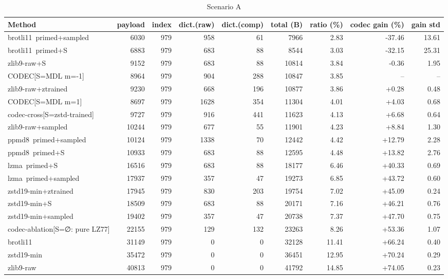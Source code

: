 \begin{table}[h]\centering\footnotesize\caption{Scenario A}\begin{tabular}{lrrrrrrrr}\toprule
Method & payload & index & dict.(raw) & dict.(comp) & total (B) & ratio (\%) & codec gain (\%) & gain std \\\midrule
brotli11~primed+sampled & 6030 & 979 & 958 & 61 & 7966 & 2.83 & -37.46 & 13.61 \\
brotli11~primed+S & 6883 & 979 & 683 & 88 & 8544 & 3.03 & -32.15 & 25.31 \\
zlib9-raw+S & 9152 & 979 & 683 & 88 & 10814 & 3.84 & -0.36 & 1.95 \\
CODEC[S=MDL m=-1] & 8964 & 979 & 904 & 288 & 10847 & 3.85 & -- & -- \\
zlib9-raw+ztrained & 9230 & 979 & 668 & 196 & 10877 & 3.86 & +0.28 & 0.48 \\
CODEC[S=MDL m=1] & 8697 & 979 & 1628 & 354 & 11304 & 4.01 & +4.03 & 0.68 \\
codec-cross[S=zstd-trained] & 9727 & 979 & 916 & 441 & 11623 & 4.13 & +6.68 & 0.64 \\
zlib9-raw+sampled & 10244 & 979 & 677 & 55 & 11901 & 4.23 & +8.84 & 1.30 \\
ppmd8~primed+sampled & 10124 & 979 & 1338 & 70 & 12442 & 4.42 & +12.79 & 2.28 \\
ppmd8~primed+S & 10933 & 979 & 683 & 88 & 12595 & 4.48 & +13.82 & 2.76 \\
lzma~primed+S & 16516 & 979 & 683 & 88 & 18177 & 6.46 & +40.33 & 0.69 \\
lzma~primed+sampled & 17937 & 979 & 357 & 47 & 19273 & 6.85 & +43.72 & 0.60 \\
zstd19-min+ztrained & 17945 & 979 & 830 & 203 & 19754 & 7.02 & +45.09 & 0.24 \\
zstd19-min+S & 18509 & 979 & 683 & 88 & 20171 & 7.16 & +46.21 & 0.76 \\
zstd19-min+sampled & 19402 & 979 & 357 & 47 & 20738 & 7.37 & +47.70 & 0.75 \\
codec-ablation[S=∅: pure LZ77] & 22155 & 979 & 129 & 132 & 23263 & 8.26 & +53.36 & 1.07 \\
brotli11 & 31149 & 979 & 0 & 0 & 32128 & 11.41 & +66.24 & 0.40 \\
zstd19-min & 35472 & 979 & 0 & 0 & 36451 & 12.95 & +70.24 & 0.29 \\
zlib9-raw & 40813 & 979 & 0 & 0 & 41792 & 14.85 & +74.05 & 0.23 \\

\end{tabular}
\end{table}

